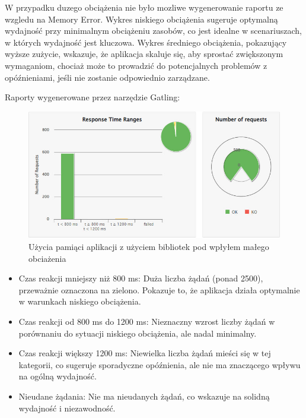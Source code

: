 \documentclass[runningheads,12pt]{llncs}
\begin{document}
W przypadku duzego obciążenia nie było mozliwe wygenerowanie raportu ze wzgledu na Memory Error.
Wykres niskiego obciążenia sugeruje optymalną wydajność przy minimalnym obciążeniu zasobów, co jest idealne w scenariuszach, w których wydajność jest kluczowa. Wykres średniego obciążenia, pokazujący wyższe zużycie, wskazuje, że aplikacja skaluje się, aby sprostać zwiększonym wymaganiom, chociaż może to prowadzić do potencjalnych problemów z opóźnieniami, jeśli nie zostanie odpowiednio zarządzane.


Raporty wygenerowane przez narzędzie Gatling:


\begin{figure}
    \includegraphics[width=\linewidth]{images/sdk-gatling-low-graph.jpg}
    \caption{Użycia pamiąci aplikacji z użyciem bibliotek pod wpłyłem małego obciażenia} \label{fig1}
\end{figure}

\begin{itemize} 
    \item Czas reakcji mniejszy niż 800 ms: Duża liczba żądań (ponad 2500), przeważnie oznaczona na zielono. Pokazuje to, że aplikacja działa optymalnie w warunkach niskiego obciążenia.
    \item Czas reakcji od 800 ms do 1200 ms: Nieznaczny wzrost liczby żądań w porównaniu do sytuacji niskiego obciążenia, ale nadal minimalny.
    \item Czas reakcji większy 1200 ms: Niewielka liczba żądań mieści się w tej kategorii, co sugeruje sporadyczne opóźnienia, ale nie ma znaczącego wpływu na ogólną wydajność.
    \item Nieudane żądania: Nie ma nieudanych żądań, co wskazuje na solidną wydajność i niezawodność.
\end{itemize}
\end{document}

